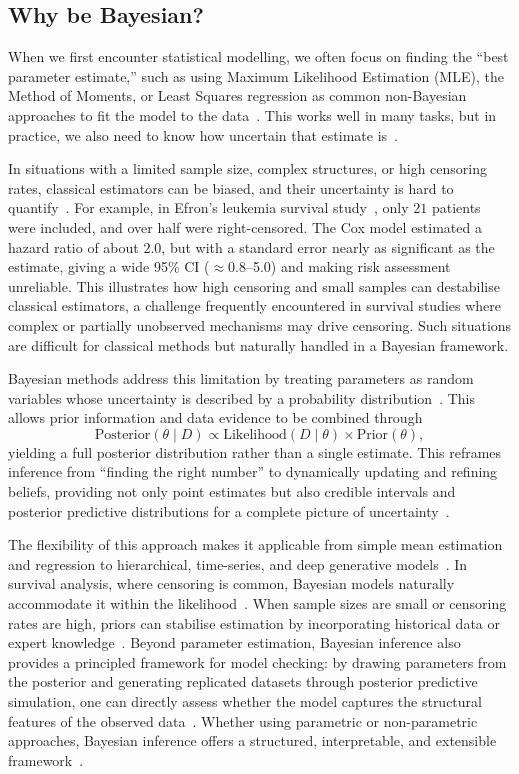 \subsection{Why be Bayesian?}
\label{Why Bayesian}
When we first encounter statistical modelling, we often focus on finding the “best parameter estimate,” such as using Maximum Likelihood Estimation (MLE), the Method of Moments, or Least Squares regression as common non-Bayesian approaches to fit the model to the data~\cite{van2021bayesian}. This works well in many tasks, but in practice, we also need to know how uncertain that estimate is~\cite{gelman1995bayesian}. 

In situations with a limited sample size, complex structures, or high censoring rates, classical estimators can be biased, and their uncertainty is hard to quantify~\cite{van2021bayesian, ibrahim2013bayesian}. For example, in Efron’s leukemia survival study~\cite{Efron01091977}, only $21$ patients were included, and over half were right-censored. The Cox model estimated a hazard ratio of about $2.0$, but with a standard error nearly as significant as the estimate, giving a wide 95\% CI ($\approx$0.8–5.0) and making risk assessment unreliable. This illustrates how high censoring and small samples can destabilise classical estimators, a challenge frequently encountered in survival studies where complex or partially unobserved mechanisms may drive censoring. Such situations are difficult for classical methods but naturally handled in a Bayesian framework.

Bayesian methods address this limitation by treating parameters as random variables whose uncertainty is described by a probability distribution~\cite{gelman1995bayesian}. This allows prior information and data evidence to be combined through
$$
\text{Posterior}(\theta \mid D)
\propto
\text{Likelihood}( D \mid \theta)
\times
\text{Prior}(\theta),
$$
yielding a full posterior distribution rather than a single estimate. This reframes inference from “finding the right number” to dynamically updating and refining beliefs, providing not only point estimates but also credible intervals and posterior predictive distributions for a complete picture of uncertainty~\cite{gelman1995bayesian}.

The flexibility of this approach makes it applicable from simple mean estimation and regression to hierarchical, time-series, and deep generative models~\cite{carlin1997bayes}. In survival analysis, where censoring is common, Bayesian models naturally accommodate it within the likelihood~\cite{bartovs2022informed}. When sample sizes are small or censoring rates are high, priors can stabilise estimation by incorporating historical data or expert knowledge~\cite{gelman1995bayesian}. Beyond parameter estimation, Bayesian inference also provides a principled framework for model checking: by drawing parameters from the posterior and generating replicated datasets through posterior predictive simulation, one can directly assess whether the model captures the structural features of the observed data~\cite{https://doi.org/10.1002/ecm.1314, cho2025nonlinear}. Whether using parametric or non-parametric approaches, Bayesian inference offers a structured, interpretable, and extensible framework~\cite{van2021bayesian}. 


